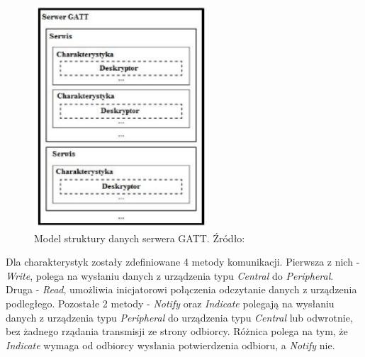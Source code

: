 \begin{figure}[H]
	\centering
	\includegraphics[width=6.5cm]{img/theory/BLE/ble_services.png}
	\caption{Model struktury danych serwera GATT. Źródło: \cite{inzynierka}}
	\label{fig:image_ble_services}
\end{figure}

Dla charakterystyk zostały zdefiniowane 4 metody komunikacji. Pierwsza z nich - \textit{Write}, polega na wysłaniu danych z urządzenia typu \textit{Central} do \textit{Peripheral}. Druga - \textit{Read}, umożliwia inicjatorowi połączenia odczytanie danych z urządzenia podległego. Pozostałe 2 metody - \textit{Notify} oraz \textit{Indicate} polegają na wysłaniu danych z urządzenia typu \textit{Peripheral} do urządzenia typu \textit{Central} lub odwrotnie, bez żadnego rządania transmisji ze strony odbiorcy. Różnica polega na tym, że \textit{Indicate} wymaga od odbiorcy wysłania potwierdzenia odbioru, a \textit{Notify} nie.

